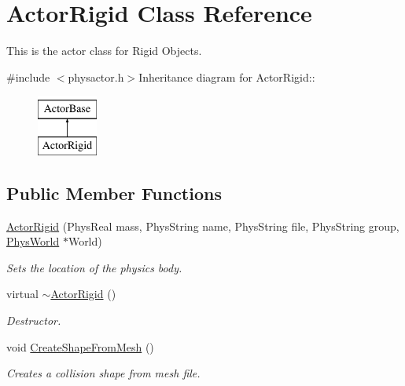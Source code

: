 \hypertarget{classActorRigid}{
\section{ActorRigid Class Reference}
\label{d5/d10/classActorRigid}
}


This is the actor class for Rigid Objects.  


{\ttfamily \#include $<$physactor.h$>$}Inheritance diagram for ActorRigid::\begin{figure}[H]
\begin{center}
\leavevmode
\includegraphics[height=2cm]{d5/d10/classActorRigid}
\end{center}
\end{figure}
\subsection*{Public Member Functions}
\begin{DoxyCompactItemize}
\item 
\hyperlink{classActorRigid_a8313ce86811d7233b8672f562306976c}{ActorRigid} (PhysReal mass, PhysString name, PhysString file, PhysString group, \hyperlink{classPhysWorld}{PhysWorld} $\ast$World)
\begin{DoxyCompactList}\small\item\em Sets the location of the physics body. \item\end{DoxyCompactList}\item 
virtual \hyperlink{classActorRigid_a36b9eb18fc9e83769a48eb1c34312889}{$\sim$ActorRigid} ()
\begin{DoxyCompactList}\small\item\em Destructor. \item\end{DoxyCompactList}\item 
void \hyperlink{classActorRigid_a1a1b7ca97c69bb5420a76116c388b3d1}{CreateShapeFromMesh} ()
\begin{DoxyCompactList}\small\item\em Creates a collision shape from mesh file. \item\end{DoxyCompactList}\end{DoxyCompactItemize}
